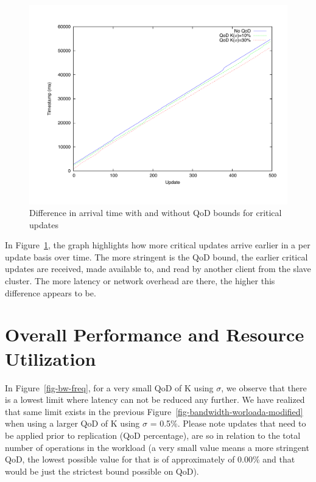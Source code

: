 \begin{figure}[h]
\centering
\includegraphics[width=1.0\textwidth]{figs/timestamps-critical-updates.pdf}
\caption{Difference in arrival time with and without QoD bounds for critical updates}
\label{fig-timestamps-critical-updates}
\end{figure}

In Figure~\ref{fig-timestamps-critical-updates}, the graph highlights how more critical updates arrive earlier in a per update basis over time. The more stringent is the QoD bound, the earlier critical updates are received, made available to, and read by another client from the slave cluster. The more latency or network overhead are there, the higher this difference appears to be.

\section{Overall Performance and Resource Utilization}
In Figure~\ref{fig-bw-freq}, for a very small QoD of K using $\sigma$, we observe that there is a lowest limit where latency can not be reduced any further. We have realized that same limit exists in the previous Figure~\ref{fig-bandwidth-worloada-modified} when using a larger QoD of K using $\sigma$ = 0.5\%. Please note updates that need to be applied prior to replication (QoD percentage), are so in relation to the total number of operations in the workload (a very small value means a more stringent QoD, the lowest possible value for that is of approximately of 0.00\% and that would be just the strictest bound possible on QoD).

